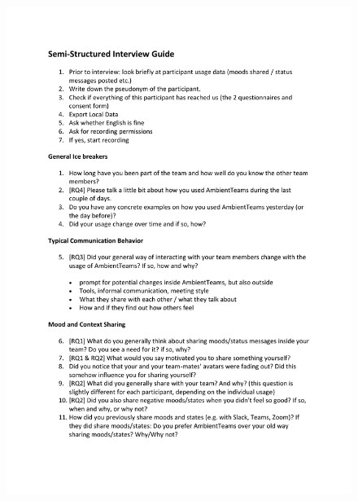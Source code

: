 \begin{figure}[h]
    \centering
    \includegraphics[width=\linewidth, page=2]{./documents/Semi-Structured Interview Guide.pdf}
\end{figure}

